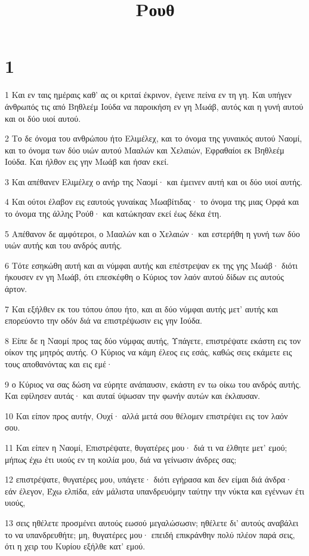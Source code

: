 

\title{Ρουθ}


\chapter{1}

\par 1 Και εν ταις ημέραις καθ' ας οι κριταί έκρινον, έγεινε πείνα εν τη γη. Και υπήγεν άνθρωπός τις από Βηθλεέμ Ιούδα να παροικήση εν γη Μωάβ, αυτός και η γυνή αυτού και οι δύο υιοί αυτού.
\par 2 Το δε όνομα του ανθρώπου ήτο Ελιμέλεχ, και το όνομα της γυναικός αυτού Ναομί, και το όνομα των δύο υιών αυτού Μααλών και Χελαιών, Εφραθαίοι εκ Βηθλεέμ Ιούδα. Και ήλθον εις γην Μωάβ και ήσαν εκεί.
\par 3 Και απέθανεν Ελιμέλεχ ο ανήρ της Ναομί· και έμεινεν αυτή και οι δύο υιοί αυτής.
\par 4 Και ούτοι έλαβον εις εαυτούς γυναίκας Μωαβίτιδας· το όνομα της μιας Ορφά και το όνομα της άλλης Ρούθ· και κατώκησαν εκεί έως δέκα έτη.
\par 5 Απέθανον δε αμφότεροι, ο Μααλών και ο Χελαιών· και εστερήθη η γυνή των δύο υιών αυτής και του ανδρός αυτής.
\par 6 Τότε εσηκώθη αυτή και αι νύμφαι αυτής και επέστρεψαν εκ της γης Μωάβ· διότι ήκουσεν εν γη Μωάβ, ότι επεσκέφθη ο Κύριος τον λαόν αυτού δίδων εις αυτούς άρτον.
\par 7 Και εξήλθεν εκ του τόπου όπου ήτο, και αι δύο νύμφαι αυτής μετ' αυτής και επορεύοντο την οδόν διά να επιστρέψωσιν εις γην Ιούδα.
\par 8 Είπε δε η Ναομί προς τας δύο νύμφας αυτής, Υπάγετε, επιστρέψατε εκάστη εις τον οίκον της μητρός αυτής. Ο Κύριος να κάμη έλεος εις εσάς, καθώς σεις εκάμετε εις τους αποθανόντας και εις εμέ·
\par 9 ο Κύριος να σας δώση να εύρητε ανάπαυσιν, εκάστη εν τω οίκω του ανδρός αυτής. Και εφίλησεν αυτάς· και αυταί ύψωσαν την φωνήν αυτών και έκλαυσαν.
\par 10 Και είπον προς αυτήν, Ουχί· αλλά μετά σου θέλομεν επιστρέψει εις τον λαόν σου.
\par 11 Και είπεν η Ναομί, Επιστρέψατε, θυγατέρες μου· διά τι να έλθητε μετ' εμού; μήπως έχω έτι υιούς εν τη κοιλία μου, διά να γείνωσιν άνδρες σας;
\par 12 επιστρέψατε, θυγατέρες μου, υπάγετε· διότι εγήρασα και δεν είμαι διά άνδρα· εάν έλεγον, Έχω ελπίδα, εάν μάλιστα υπανδρευόμην ταύτην την νύκτα και εγέννων έτι υιούς,
\par 13 σεις ηθέλετε προσμένει αυτούς εωσού μεγαλώσωσιν; ηθέλετε δι' αυτούς αναβάλει το να υπανδρευθήτε; μη, θυγατέρες μου· επειδή επικράνθην πολύ πλέον παρά σεις, ότι η χειρ του Κυρίου εξήλθε κατ' εμού.
